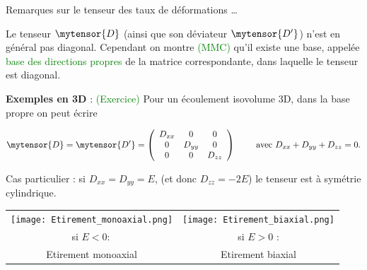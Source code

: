 \begin{frame}{Remarques sur le tenseur des taux de déformations  \ldots}
\small

Le tenseur $\mytensor{D}$ (ainsi que son déviateur $\mytensor{D'}$) n'est en général pas diagonal.
Cependant on montre \textcolor{green}{(MMC)} qu'il existe une base, appelée \textcolor{green}{base des directions propres} de la matrice correspondante, dans laquelle le tenseur est diagonal.

\medskip
\pause
{\bf Exemples en 3D } :   \textcolor{green}{(Exercice)}
Pour un écoulement isovolume 3D, dans la base propre on peut écrire 
 
\[
\mytensor{D} = \mytensor{D'} = 
	\left(
	\begin{array}{ccc}
		D_{xx} & 0 & 0 
		\\
		0 & D_{yy} & 0
		\\
		0 & 0 & D_{zz}
	\end{array}
	\right)
\qquad \mbox{ avec } D_{xx}+ D_{yy} + D_{zz} = 0.
\]

Cas particulier : si $D_{xx} = D_{yy} = E$, (et donc $D_{zz} = -2 E$) le tenseur est à symétrie cylindrique.

\begin{center}
\begin{tabular}{cc}
	\texttt{[image: Etirement\_monoaxial.png]}
	&
	\texttt{[image: Etirement\_biaxial.png]}\\
	si $E <0 :$ & si $E>0$  :
	\\ 
	Etirement monoaxial & 
	Etirement biaxial
	\end{tabular}
\end{center}






\end{frame}




